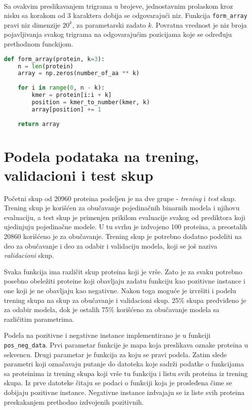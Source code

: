~\\
Sa ovakvim preslikavanjem trigrama u brojeve, jednostavnim prolaskom kroz nisku sa korakom od 3 karaktera dobija se odgovarajući niz. Funkcija \verb|form_array| pravi niz dimenzije $20^k$, za parametarski zadato $k$. Povratna vrednost je niz broja pojavljivanja svakog trigrama na odgovarajućim pozicijama koje se određuju prethodnom funckijom.

\begin{lstlisting}[language=Python]
def form_array(protein, k=3):
	n = len(protein)
	array = np.zeros(number_of_aa ** k)
	
	for i in range(0, n - k):
		kmer = protein[i:i + k]
		position = kmer_to_number(kmer, k)
		array[position] += 1
	
	return array
\end{lstlisting}
 

\section{Podela podataka na trening, validacioni i test skup}

Početni skup od 20960 proteina podeljen je na dve grupe - \textit{trening} i \textit{test} skup. Trening skup je korišćen za obučavanje pojedinačnih binarnih modela i njihovu evaluaciju, a test skup je primenjen prikilom evaluacije svakog od prediktora koji ujedinjuju pojedinačne modele. U tu svrhu je izdvojeno 100 proteina, a preostalih 20860 korišćeno je za obučavanje. Trening skup je potrebno dodatno podeliti na deo za obučavanje i deo za odabir i validaciju modela, koji se još naziva \textit{validacioni} skup.

Svaka funkcija ima različit skup proteina koji je vrše. Zato je za svaku potrebno posebno obeležiti proteine koji obavljaju zadatu funkciju kao pozitivne instance i one koji je ne obavljaju kao negativne. Nakon toga moguće je izvršiti i podelu trening skupa na skup za obučavanje i validacioni skup. 25\% skupa predviđeno je za odabir modela, dok je ostalih 75\% korišćeno za obučavanje modela sa različitim parametrima. 


Podela na pozitivne i negativne instance implementirano je u funkciji \verb|pos_neg_data|. Prvi parametar funkcije je mapa koja preslikava oznake proteina u sekvencu. Drugi parametar je funkcija za koju se pravi podela. Zatim slede parametri koji označavaju putanje do datoteka koje sadrži podatke o funkcijama sa proteinima iz trening skupa koji vrše tu funkciju i listu svih proteina iz trening skupa. Iz prve datoteke čitaju se podaci o funkciji koja je prosleđena čime se dobijaju pozitivne instance. Negativne instance izdvajaju se iz liste svih proteina preskakanjem prethodno izdvojenih pozitivnih. 


